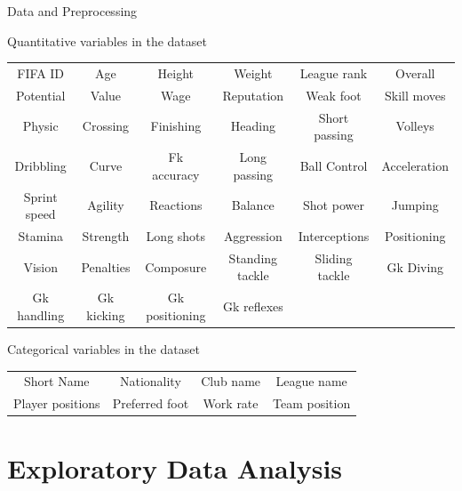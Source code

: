 \documentclass[aspectratio=169,xcolor=dvipsnames]{beamer}
\begin{document}
\begin{frame}{Data and Preprocessing}
\begin{small}
\begin{block}{Quantitative variables in the dataset}
\begin{table}[ht]
\centering
\begin{tabular}{cccccc}
    FIFA ID & Age & Height & Weight & League rank & Overall\\ 
    Potential & Value & Wage & Reputation & Weak foot & Skill moves\\
    Physic & Crossing & Finishing & Heading & Short passing & Volleys\\
    Dribbling & Curve & Fk accuracy & Long passing & Ball Control & Acceleration\\
    Sprint speed & Agility & Reactions & Balance& Shot power&  Jumping\\   
    Stamina & Strength & Long shots & Aggression & Interceptions& Positioning\\
    Vision&  Penalties & Composure & Standing tackle& Sliding tackle & Gk Diving\\
    Gk handling & Gk kicking& Gk positioning & Gk reflexes
\end{tabular}
\end{table}
\end{block}
\end{small}
\begin{small}
\begin{block}{Categorical variables in the dataset}
\begin{table}[ht]
\centering
\begin{tabular}{cccc}
  Short Name & Nationality & Club name & League name\\
  Player positions & Preferred foot & Work rate & Team position
\end{tabular}
\end{table}
\end{block}
\end{small}
\end{frame}


\section{Exploratory Data Analysis}

\end{document}
